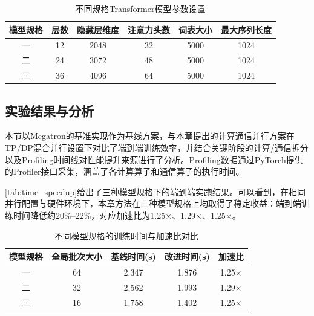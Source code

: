 \begin{table}[!htbp]
    \centering
    \caption{不同规格Transformer模型参数设置}
    \label{tab:transformer_model_para}
    \begin{tabular}{cccccc}
        \toprule
        模型规格 & 层数 & 隐藏层维度 & 注意力头数 & 词表大小 & 最大序列长度 \\
        \midrule
        一 & 12 & 2048 & 32 & 5000 & 1024\\
        二 & 24 & 3072 & 48 & 5000 & 1024\\
        三 & 36 & 4096 & 64 & 5000 & 1024\\
        \bottomrule
    \end{tabular}
\end{table}

\subsection{实验结果与分析}

本节以Megatron的基准实现作为基线方案，与本章提出的计算通信并行方案在TP/DP混合并行设置下对比了端到端训练效率，并结合关键阶段的计算/通信拆分以及Profiling时间线对性能提升来源进行了分析。Profiling数据通过PyTorch提供的Profiler接口采集，涵盖了各计算算子和通信算子的执行时间。

\autoref{tab:time_speedup}给出了三种模型规格下的端到端实跑结果。可以看到，在相同并行配置与硬件环境下，本章方法在三种模型规格上均取得了稳定收益：端到端训练时间降低约20\%--22\%，对应加速比为1.25$\times$、1.29$\times$、1.25$\times$。



\begin{table}[htbp]
\centering
\caption{不同模型规格的训练时间与加速比对比}
\label{tab:time_speedup}
\begin{tabular}{c c c c c}
\toprule
模型规格 & 全局批次大小 %
& 基线时间(s) & 改进时间(s) & 加速比 \\
\midrule
一 & 64 & 2.347 & 1.876 & 1.25$\times$ \\
二 & 32 & 2.562 & 1.993 & 1.29$\times$ \\
三 & 16 & 1.758 & 1.402 & 1.25$\times$ \\
\bottomrule
\end{tabular}
\end{table}



